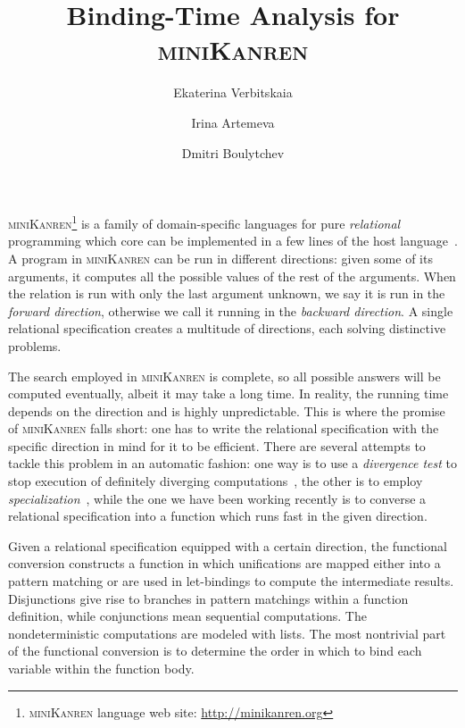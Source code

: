 \documentclass[submission,copyright,creativecommons]{eptcs}
\title{Binding-Time Analysis for \textsc{miniKanren}}
\author{Ekaterina Verbitskaia
\institute{JetBrains Research\\
Saint Petersburg, Russia}
\email{kajigor@gmail.com}
\and
Irina Artemeva
\institute{IFMO University\\
Saint Petersburg, Russia}
\email{irina-pluralia@rambler.ru}
\and
Dmitri Boulytchev
\institute{SPbSU\\
Saint Petersburg, Russia}
\email{dboulytchev@gmail.com}
}
\newcommand{\miniKanren}{\textsc{miniKanren}}
\begin{document}
\maketitle


\miniKanren{}\footnote{\miniKanren{} language web site: \url{http://minikanren.org}} is a family of domain-specific languages for pure \emph{relational} programming which core can be implemented in a few lines of the host language~\cite{hemann2013ukanren}.
A program in \miniKanren{} can be run in different directions: given some of its arguments, it computes all the possible values of the rest of the arguments.
When the relation is run with only the last argument unknown, we say it is run in the \emph{forward direction}, otherwise we call it running in the \emph{backward direction}.
A single relational specification creates a multitude of directions, each solving distinctive problems.

The search employed in \miniKanren{} is complete, so all possible answers will be computed eventually, albeit it may take a long time.
In reality, the running time depends on the direction and is highly unpredictable.
This is where the promise of \miniKanren{} falls short: one has to write the relational specification with the specific direction in mind for it to be efficient.
There are several attempts to tackle this problem in an automatic fashion: one way is to use a \emph{divergence test} to stop execution of definitely diverging computations~\cite{rozplokhas2018improving}, the other is to employ \emph{specialization}~\cite{lozov2019relational}, while the one we have been working recently is to converse a relational specification into a function which runs fast in the given direction.

Given a relational specification equipped with a certain direction, the functional conversion constructs a function in which unifications are mapped either into a pattern matching or are used in let-bindings to compute the intermediate results.
Disjunctions give rise to branches in pattern matchings within a function definition, while conjunctions mean sequential computations.
The nondeterministic computations are modeled with lists.
The most nontrivial part of the functional conversion is to determine the order in which to bind each variable within the function body.
\end{document}
